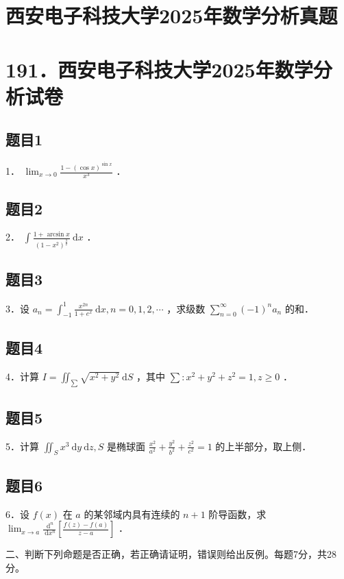 \documentclass{article}
\begin{document}
\section*{西安电子科技大学2025年数学分析真题}
\section*{191．西安电子科技大学2025年数学分析试卷}

\subsection{题目1}
1． \(\lim _{x \rightarrow 0} \frac{1-(\cos x)^{\sin x}}{x^{3}}\) ．

\subsection{题目2}
2． \(\int \frac{1+\arcsin x}{\left(1-x^{2}\right)^{\frac{3}{2}}} \mathrm{~d} x\) ．

\subsection{题目3}
3．设 \(a_{n}=\int_{-1}^{1} \frac{x^{2 n}}{1+e^{x}} \mathrm{~d} x, n=0,1,2, \cdots\) ，求级数 \(\sum_{n=0}^{\infty}(-1)^{n} a_{n}\) 的和．

\subsection{题目4}
4．计算 \(I=\iint_{\sum} \sqrt{x^{2}+y^{2}} \mathrm{~d} S\) ，其中 \(\sum: x^{2}+y^{2}+z^{2}=1, z \geq 0\) ．

\subsection{题目5}
5．计算 \(\iint_{S} x^{3} \mathrm{~d} y \mathrm{~d} z, S\) 是椭球面 \(\frac{x^{2}}{a^{2}}+\frac{y^{2}}{b^{2}}+\frac{z^{2}}{c^{2}}=1\) 的上半部分，取上侧．

\subsection{题目6}
6．设 \(f(x)\) 在 \(a\) 的某邻域内具有连续的 \(n+1\) 阶导函数，求 \(\lim _{x \rightarrow a} \frac{\mathrm{~d}^{n}}{\mathrm{~d} x^{n}}\left[\frac{f(z)-f(a)}{z-a}\right]\) ．

二、判断下列命题是否正确，若正确请证明，错误则给出反例。每题7分，共28分。
\end{document}
